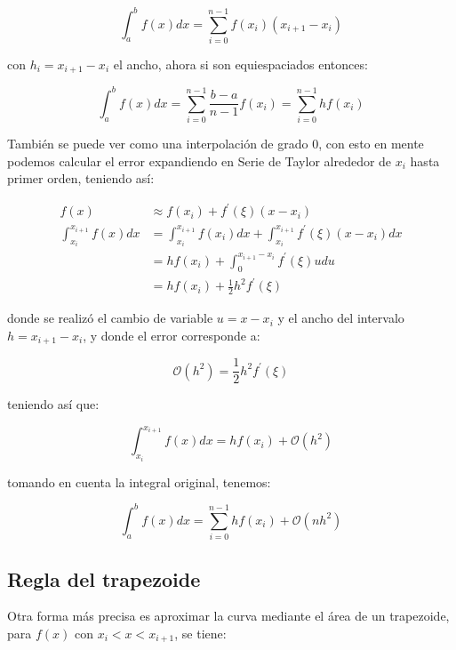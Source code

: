 \begin{equation*}
  \int_a^b f(x)dx = \sum_{i=0}^{n-1} f(x_i)(x_{i+1}-x_i)
\end{equation*}

con $h_i= x_{i+1}-x_i$ el ancho, ahora si son equiespaciados entonces:

\begin{equation*}
  \int_a^b f(x)dx = \sum_{i=0}^{n-1} \frac{b-a}{n-1} f(x_i) = \sum_{i=0}^{n-1} hf(x_i)
  \end{equation*}

También se puede ver como una interpolación de grado 0, con esto en mente podemos calcular el error expandiendo en Serie de Taylor alrededor de $x_i$ hasta primer orden, teniendo así:

\begin{align*}
  f(x) &\approx f(x_i) + f^\prime(\xi)(x-x_i) \\ 
\int_{x_i}^{x_{i+1}} f(x)dx &= \int_{x_i}^{x_{i+1}} f(x_i) dx + \int_{x_i}^{x_{i+1}} f^\prime(\xi)(x-x_i)dx \\
   &=  hf(x_i) +  \int_0^{x_{i+1}-x_i} f^\prime(\xi)u du\\
   &= hf(x_i) + \frac{1}{2} h^2 f^\prime(\xi)
\end{align*}

donde se realizó el cambio de variable $u=x-x_i$ y el ancho del intervalo $h=x_{i+1}-x_i$, y donde el error corresponde a:

\begin{equation*}
  \mathcal{O}(h^2) = \frac{1}{2}h^2 f^\prime(\xi)
\end{equation*}

 teniendo así que:

 \begin{equation*}
   \int_{x_i}^{x_{i+1}} f(x) dx = hf(x_i) + \mathcal{O}(h^2)
 \end{equation*}

 tomando en cuenta la integral original, tenemos:

\begin{equation*}
  \int_a^b f(x) dx = \sum_{i=0}^{n-1}hf(x_i) + \mathcal{O}(n h^2)
 \end{equation*}


 \subsection{Regla del trapezoide}
Otra forma más precisa es aproximar la curva mediante el área de un trapezoide, para $f(x)$ con $x_i<x<x_{i+1}$, se tiene:

